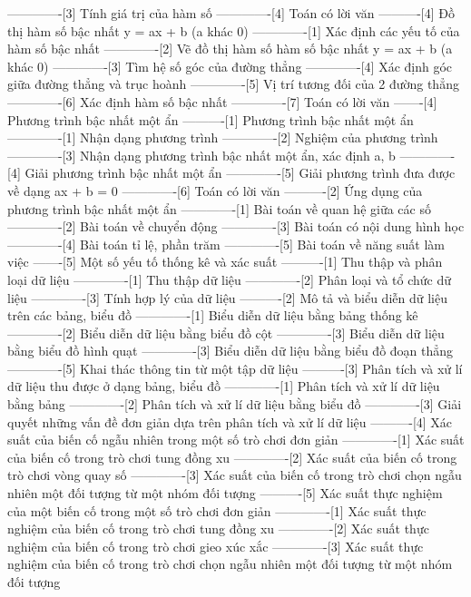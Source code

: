 -------------[3] Tính giá trị của hàm số
-------------[4] Toán có lời văn
----------[4] Đồ thị hàm số bậc nhất y = ax + b (a khác 0)
-------------[1] Xác định các yếu tố của hàm số bậc nhất
-------------[2] Vẽ đồ thị hàm số hàm số bậc nhất y = ax + b (a khác 0)
-------------[3] Tìm hệ số góc của đường thẳng
-------------[4] Xác định góc giữa đường thẳng và trục hoành
-------------[5] Vị trí tương đối của 2 đường thẳng
-------------[6] Xác định hàm số bậc nhất
-------------[7] Toán có lời văn
-------[4] Phương trình bậc nhất một ẩn
----------[1] Phương trình bậc nhất một ẩn
-------------[1] Nhận dạng phương trình
-------------[2] Nghiệm của phương trình
-------------[3] Nhận dạng phương trình bậc nhất một ẩn, xác định a, b
-------------[4] Giải phương trình bậc nhất một ẩn
-------------[5] Giải phương trình đưa được về dạng ax + b = 0
-------------[6] Toán có lời văn
----------[2] Ứng dụng của phương trình bậc nhất một ẩn
-------------[1] Bài toán về quan hệ giữa các số
-------------[2] Bài toán về chuyển động
-------------[3] Bài toán có nội dung hình học
-------------[4] Bài toán tỉ lệ, phần trăm
-------------[5] Bài toán về năng suất làm việc
-------[5] Một số yếu tố thống kê và xác suất
----------[1] Thu thập và phân loại dữ liệu
-------------[1] Thu thập dữ liệu
-------------[2] Phân loại và tổ chức dữ liệu
-------------[3] Tính hợp lý của dữ liệu
----------[2] Mô tả và biểu diễn dữ liệu trên các bảng, biểu đồ
-------------[1] Biểu diễn dữ liệu bằng bảng thống kê
-------------[2] Biểu diễn dữ liệu bằng biểu đồ cột
-------------[3] Biểu diễn dữ liệu bằng biểu đồ hình quạt
-------------[3] Biểu diễn dữ liệu bằng biểu đồ đoạn thẳng
-------------[5] Khai thác thông tin từ một tập dữ liệu
----------[3] Phân tích và xử lí dữ liệu thu được ở dạng bảng, biểu đồ
-------------[1] Phân tích và xử lí dữ liệu bằng bảng
-------------[2] Phân tích và xử lí dữ liệu bằng biểu đồ
-------------[3] Giải quyết những vấn đề đơn giản dựa trên phân tích và xử lí dữ liệu
----------[4] Xác suất của biến cố ngẫu nhiên trong một số trò chơi đơn giản
-------------[1] Xác suất của biến cố trong trò chơi tung đồng xu
-------------[2] Xác suất của biến cố trong trò chơi vòng quay số
-------------[3] Xác suất của biến cố trong trò chơi chọn ngẫu nhiên một đối tượng từ một nhóm đối tượng
----------[5] Xác suất thực nghiệm của một biến cố trong một số trò chơi đơn giản
-------------[1] Xác suất thực nghiệm của biến cố trong trò chơi tung đồng xu
-------------[2] Xác suất thực nghiệm của biến cố trong trò chơi gieo xúc xắc
-------------[3] Xác suất thực nghiệm của biến cố trong trò chơi chọn ngẫu nhiên một đối tượng từ một nhóm đối tượng

